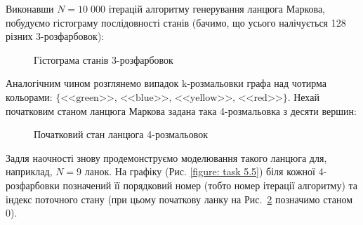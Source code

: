 \documentclass[a4paper,14pt]{extarticle} %
\numberwithin{equation}{section}
\begin{document}
Виконавши $N=10\;000$ ітерацій алгоритму генерування ланцюга Маркова, побудуємо гістограму послідовності станів (бачимо, що усього налічується 128 різних 3-розфарбовок): 

\begin{figure}[H]
    \caption{Гістограма станів 3-розфарбовок}
    \label{figure: task 5.3}
\end{figure}

\newpage

Аналогічним чином розглянемо випадок k-розмальовки графа над чотирма кольорами: $\{\text{<<green>>, <<blue>>, <<yellow>>, <<red>>}\}$. Нехай початковим станом ланцюга Маркова задана така 4-розмальовка з десяти вершин:

\begin{figure}[H]
    \caption{Початковий стан ланцюга 4-розмальовок}
    \label{figure: task 5.4}
\end{figure}

Задля наочності знову продемонструємо моделювання такого ланцюга для, наприклад, $N=9$ ланок. На графіку (Рис. \ref{figure: task 5.5}) біля кожної 4-розфарбовки позначений її порядковий номер (тобто номер ітерації алгоритму) та індекс поточного стану (при цьому початкову ланку на Рис.~\ref{figure: task 5.4} позначимо станом 0).
\end{document}
